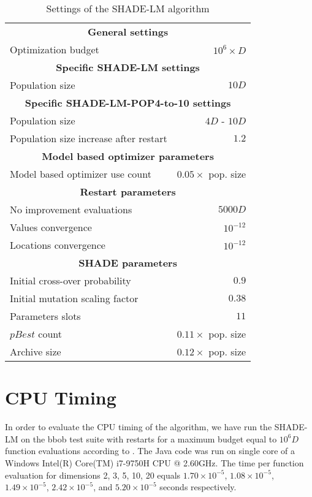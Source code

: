 \documentclass[manuscript]{acmart}
\begin{document}
\begin{table}[!ht]
	\caption{Settings of the SHADE-LM algorithm
	\label{tab:algorithm-settings}}
	\begin{center}
	\begin{tabular}{lr}
		\multicolumn{2}{c}{\textbf{General settings}} \\
		Optimization budget & $10^6 \times D$ \\
		\multicolumn{2}{c}{\textbf{Specific SHADE-LM settings}} \\
		Population size & $10D$ \\
		\multicolumn{2}{c}{\textbf{Specific SHADE-LM-POP4-to-10 settings}} \\
		Population size & $4D$ - $10D$ \\
		Population size increase after restart & $1.2$ \\
		\multicolumn{2}{c}{\textbf{Model based optimizer parameters}} \\
		Model based optimizer use count & $0.05 \times$ pop. size \\
		\multicolumn{2}{c}{\textbf{Restart parameters}} \\
    No improvement evaluations & $5000D$ \\
    Values convergence & $10^{-12}$ \\
    Locations convergence & $10^{-12}$ \\
		\multicolumn{2}{c}{\textbf{SHADE parameters}} \\
		Initial cross-over probability & $0.9$ \\
		Initial mutation scaling factor & $0.38$ \\
    Parameters slots & $11$ \\
    $pBest$ count & $0.11 \times$ pop. size \\
    Archive size & $0.12 \times$ pop. size \\
	\end{tabular}
\end{center}
\end{table}


%
\section{CPU Timing}
In order to evaluate the CPU timing of the algorithm, we have run the {SHADE-LM}
on the {bbob test suite \cite{hansen2010fun}} with restarts for a maximum budget
equal to {$10^6D$} function evaluations according to \cite{hansen2016exp}.
The {Java} code was run on  single core of a {Windows Intel(R) Core(TM) i7-9750H CPU @ 2.60GHz}.
The time per function evaluation for dimensions 2, 3, 5, 10, 20 equals
$1.70\times10^{-5}$,
{$1.08\times10^{-5}$},
{$1.49\times10^{-5}$},
{$2.42\times10^{-5}$},
and {$5.20\times10^{-5}$}
seconds respectively. 
\end{document}
